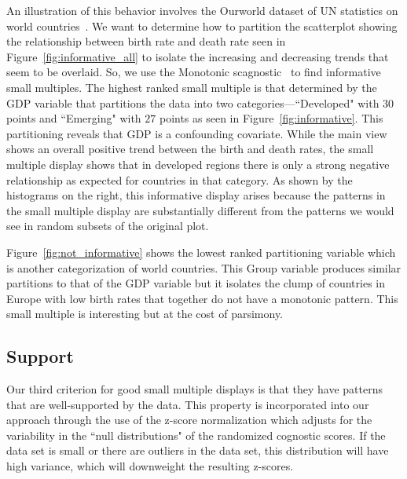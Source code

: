 An illustration of this behavior involves the Ourworld dataset of UN statistics on world countries~\cite{Wilkinson2005GG}. We want to determine how to partition the scatterplot showing the relationship between birth rate and death rate seen in Figure~\ref{fig:informative_all} to isolate the increasing and decreasing trends that seem to be overlaid. So, we use the Monotonic scagnostic~\cite{Wilkinson2005} to find informative small multiples. The highest ranked small multiple is that determined by the GDP variable that partitions the data into two categories---``Developed" with $30$ points and ``Emerging" with $27$ points as seen in Figure~\ref{fig:informative}. This partitioning reveals that GDP is a confounding covariate. While the main view shows an overall positive trend between the birth and death rates, the small multiple display shows that in developed regions there is only a strong negative relationship as expected for countries in that category. As shown by the histograms on the right, this informative display arises because the patterns in the small multiple display are substantially different from the patterns we would see in random subsets of the original plot.

Figure~\ref{fig:not_informative} shows the lowest ranked partitioning variable which is another categorization of world countries. This Group variable produces similar partitions to that of the GDP variable but it isolates the clump of countries in Europe with low birth rates that together do not have a monotonic pattern. This small multiple is interesting but at the cost of parsimony.



\subsection{Support}
Our third criterion for good small multiple displays is that they have patterns that are well-supported by the data. This property is incorporated into our approach through the use of the z-score normalization which adjusts for the variability in the ``null distributions" of the randomized cognostic scores. If the data set is small or there are outliers in the data set, this distribution will have high variance, which will downweight the resulting z-scores.

